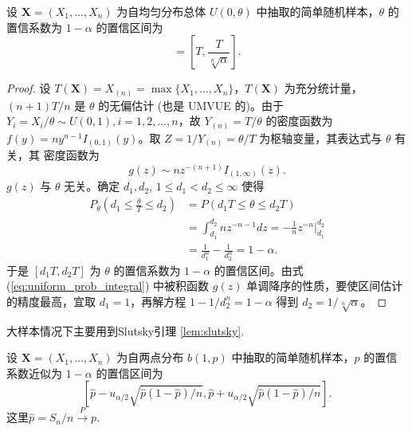 \begin{proposition}[均匀分布参数的置信区间]\label{prop:均匀分布参数的置信区间}   
设 $\mathbf{X}=(X_1, \dots, X_n)$ 为自均匀分布总体 $U(0,\theta)$ 中抽取的简单随机样本，$\theta$
的置信系数为 $1-\alpha$ 的置信区间为
\begin{equation}
[d_1 T, d_2 T] = \left[T, \frac{T}{\sqrt[n]{\alpha}}\right]. \label{eq:uniform_theta_ci}
\end{equation}
\end{proposition}
\begin{proof}
    设 $T(\mathbf{X}) = X_{(n)} = \max\{X_1, \dots, X_n\}$，$T(\mathbf{X})$ 为充分统计量，$(n+1)T/n$ 是 $\theta$ 的无偏估计 (也是 UMVUE 的)。由于 $Y_i = X_i/\theta \sim U(0,1), i=1,2,\dots,n$，故 $Y_{(n)} = T/\theta$ 的密度函数为
$f(y) = ny^{n-1}I_{(0,1)}(y)$。取 $Z=1/Y_{(n)} = \theta/T$ 为枢轴变量，其表达式与 $\theta$ 有关，其
密度函数为
\begin{equation}
g(z) \sim n z^{-(n+1)}I_{(1,\infty)}(z). \label{eq:uniform_pivotal_density}
\end{equation}
$g(z)$ 与 $\theta$ 无关。确定 $d_1, d_2$, $1 \le d_1 < d_2 \le \infty$ 使得
\begin{align}
P_\theta\left(d_1 \le \frac{\theta}{T} \le d_2\right) &= P(d_1 T \le \theta \le d_2 T) \nonumber \\
&= \int_{d_1}^{d_2} n z^{-n-1}dz = -\frac{1}{n}z^{-n}\Big|_{d_1}^{d_2} \nonumber \\
&= \frac{1}{d_1^n} - \frac{1}{d_2^n} = 1-\alpha. \label{eq:uniform_prob_integral}
\end{align}
于是 $[d_1 T, d_2 T]$ 为 $\theta$ 的置信系数为 $1-\alpha$ 的置信区间。由式 (\ref{eq:uniform_prob_integral}) 中被积函数 $g(z)$
单调降序的性质，要使区间估计的精度最高，宜取 $d_1=1$，再解方程 $1-1/d_2^n = 1-\alpha$
得到 $d_2 = 1/\sqrt[n]{\alpha}$。
\end{proof}
大样本情况下主要用到Slutsky引理 \ref{lem:slutsky}.
\begin{proposition}[二项分布总体参数的置信区间]\label{prop:二项分布总体参数的置信区间}
    设 $\mathbf{X} = (X_1, \dots, X_n)$ 为自两点分布 $b(1,p)$ 中抽取的简单随机样本，$p$ 的置信系数近似为 $1-\alpha$ 的置信区间为
\begin{equation}
\left[\hat{p} - u_{\alpha/2}\sqrt{\hat{p}(1-\hat{p})/n}, \hat{p} + u_{\alpha/2}\sqrt{\hat{p}(1-\hat{p})/n}\right]. \label{eq:binomial_p_ci}
\end{equation}
这里$\hat{p} = S_n/n \stackrel{P}{\longrightarrow} p$.
\end{proposition}


